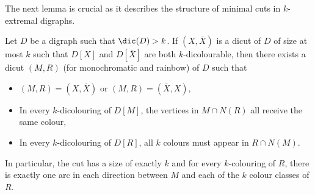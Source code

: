 
The next lemma is crucial as it describes the structure of minimal cuts in $k$-extremal digraphs.

\begin{lemma}\label{lem:mono_vs_rainbow}
    Let $D$ be a digraph such that $\dic(D) > k$. If $(X,\overline{X})$ is a dicut of $D$ of size at most $k$ such that $D[X]$ and $D[\overline X]$ are both $k$-dicolourable, then there exists a dicut $(M,R)$ (for monochromatic and rainbow) of $D$ such that 
    \begin{itemize}
    \item $(M,R)=(X,\overline{X})$ or $(M,R)=(\overline X,X)$,
    \item In every $k$-dicolouring of $D[M]$, the vertices in $M\cap N(R)$ all receive the same colour,
    \item In every $k$-dicolouring of $D[R]$, all $k$ colours must appear in $R\cap N(M)$.
    \end{itemize} 
    In particular, the cut has a size of exactly $k$ and for every $k$-colouring of $R$, there is exactly one arc in each direction between $M$ and each of the $k$ colour classes of $R$.
\end{lemma}

